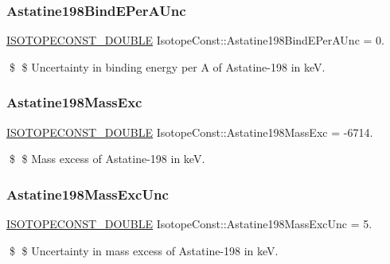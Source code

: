 \subsubsection{\texorpdfstring{Astatine198\+Bind\+E\+Per\+A\+Unc}{Astatine198BindEPerAUnc}}
{\footnotesize\ttfamily \mbox{\hyperlink{group___isotope_const-_macros_ga8f45a7272ce02c0b4c65c44636ed719a}{I\+S\+O\+T\+O\+P\+E\+C\+O\+N\+S\+T\+\_\+\+D\+O\+U\+B\+LE}} Isotope\+Const\+::\+Astatine198\+Bind\+E\+Per\+A\+Unc = 0.}

\$ \$ Uncertainty in binding energy per A of Astatine-\/198 in keV. \mbox{\label{group___isotope_const-_astatine-_at198_gaf78f6fd8e45eaf118bd91f4c2f94f857}} 
\subsubsection{\texorpdfstring{Astatine198\+Mass\+Exc}{Astatine198MassExc}}
{\footnotesize\ttfamily \mbox{\hyperlink{group___isotope_const-_macros_ga8f45a7272ce02c0b4c65c44636ed719a}{I\+S\+O\+T\+O\+P\+E\+C\+O\+N\+S\+T\+\_\+\+D\+O\+U\+B\+LE}} Isotope\+Const\+::\+Astatine198\+Mass\+Exc = -\/6714.}

\$ \$ Mass excess of Astatine-\/198 in keV. \mbox{\label{group___isotope_const-_astatine-_at198_ga13ef32611e9c20c1fac8ad20dfd1a280}} 
\subsubsection{\texorpdfstring{Astatine198\+Mass\+Exc\+Unc}{Astatine198MassExcUnc}}
{\footnotesize\ttfamily \mbox{\hyperlink{group___isotope_const-_macros_ga8f45a7272ce02c0b4c65c44636ed719a}{I\+S\+O\+T\+O\+P\+E\+C\+O\+N\+S\+T\+\_\+\+D\+O\+U\+B\+LE}} Isotope\+Const\+::\+Astatine198\+Mass\+Exc\+Unc = 5.}

\$ \$ Uncertainty in mass excess of Astatine-\/198 in keV. \mbox{\label{group___isotope_const-_astatine-_at198_ga7d7a09a998d3ab6949d8bda1ca00beff}} 
